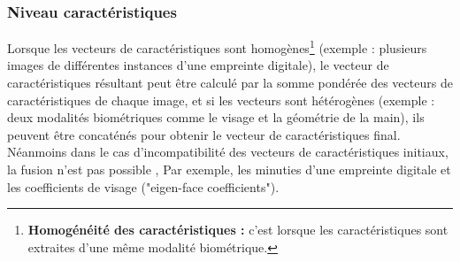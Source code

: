 \subsubsection{Niveau caractéristiques}
\label{fusionmethodesscore}
Lorsque les vecteurs de caractéristiques sont homogènes\footnote{\textbf{Homogénéité des caractéristiques :} c'est lorsque les caractéristiques sont extraites d'une même modalité biométrique.} (exemple : plusieurs images de différentes instances d’une empreinte digitale), le vecteur de caractéristiques résultant peut être calculé par la somme pondérée des vecteurs de caractéristiques de chaque image, et si les vecteurs sont hétérogènes (exemple : deux modalités biométriques comme le visage et la géométrie de la main), ils peuvent être concaténés pour obtenir le vecteur de caractéristiques final. Néanmoins dans le cas d'incompatibilité des vecteurs de caractéristiques initiaux, la fusion n’est pas possible \citep{ross2006information}, Par exemple, les minuties d’une empreinte digitale et les coefficients de visage ("eigen-face coefficients").
